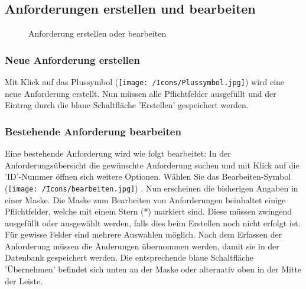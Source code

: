 \subsection{Anforderungen erstellen und bearbeiten}
\label{bkm:Ref2018071810}

\begin{figure}[H]
\caption{Anforderung erstellen oder bearbeiten}
\end{figure}

\subsubsection{Neue Anforderung erstellen}

Mit Klick auf das Plussymbol (\texttt{[image: /Icons/Plussymbol.jpg]})  wird eine neue Anforderung erstellt. Nun müssen alle Pflichtfelder ausgefüllt und der Eintrag durch die blaue Schaltfläche 'Erstellen' gespeichert werden. 

\subsubsection{Bestehende Anforderung bearbeiten}

Eine bestehende Anforderung wird wie folgt bearbeitet: In der Anforderungsübersicht die gewünschte Anforderung suchen und mit Klick auf die 'ID'-Nummer  öffnen sich weitere Optionen. Wählen Sie das Bearbeiten-Symbol (\texttt{[image: /Icons/bearbeiten.jpg]}) . Nun erscheinen die bisherigen Angaben in einer Maske. Die Maske zum Bearbeiten von Anforderungen beinhaltet einige Pflichtfelder, welche mit einem Stern (*) markiert sind. Diese müssen zwingend ausgefüllt oder ausgewählt werden, falls dies beim Erstellen noch nicht erfolgt ist. Für gewisse Felder sind mehrere Auswahlen möglich. Nach dem Erfassen der Anforderung müssen die Änderungen übernommen werden, damit sie in der Datenbank gespeichert werden. Die entsprechende blaue Schaltfläche 'Übernehmen' befindet sich unten an der Maske oder alternativ oben in der Mitte der Leiste. \\

